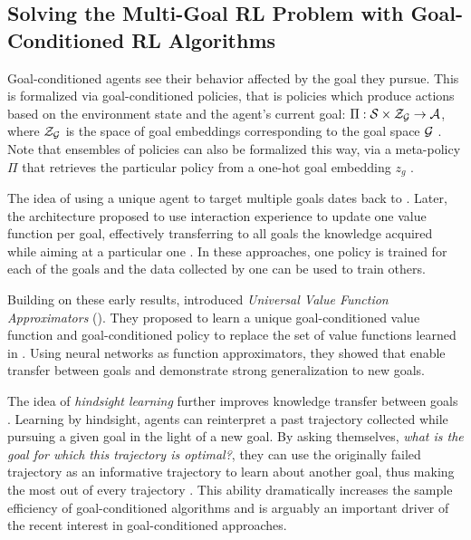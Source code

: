 \subsection{Solving the Multi-Goal RL Problem with Goal-Conditioned RL Algorithms}
Goal-conditioned agents see their behavior affected by the goal they pursue. This is formalized via goal-conditioned policies, that is policies which produce actions based on the environment state and the agent's current goal: $\Pi:\mathcal{S}\times\mathcal{Z}_{\mathcal{G}}\to\mathcal{A}$, where $\mathcal{Z}_{\mathcal{G}}$ is the space of goal embeddings corresponding to the goal space $\mathcal{G}$ \cite{schaul2015universal}. Note that ensembles of policies can also be formalized this way, via a meta-policy $\Pi$ that retrieves the particular policy from a one-hot goal embedding $z_g$ \cite{kaelbling1993learning,sutton2011horde}.

The idea of using a unique \rl agent to target multiple goals dates back to \cite{kaelbling1993learning}. Later, the \horde architecture proposed to use interaction experience to update one value function per goal, effectively transferring to all goals the knowledge acquired while aiming at a particular one \cite{sutton2011horde}. In these approaches, one policy is trained for each of the goals and the data collected by one can be used to train others.

Building on these early results, \cite{schaul2015universal} introduced \textit{Universal Value Function Approximators} (\uvfa). They proposed to learn a unique goal-conditioned value function and goal-conditioned policy to replace the set of value functions learned in \horde. Using neural networks as function approximators, they showed that \uvfas enable transfer between goals and demonstrate strong generalization to new goals.

The idea of \textit{hindsight learning} further improves knowledge transfer between goals \cite{kaelbling1993learning,andrychowicz2017hindsight}. Learning by hindsight, agents can reinterpret a past trajectory collected while pursuing a given goal in the light of a new goal. By asking themselves, \textit{what is the goal for which this trajectory is optimal?}, they can use the originally failed trajectory as an informative trajectory to learn about another goal, thus making the most out of every trajectory \cite{eysenbach2020rewriting}. This ability dramatically increases the sample efficiency of goal-conditioned algorithms and is arguably an important driver of the recent interest in goal-conditioned \rl approaches.

